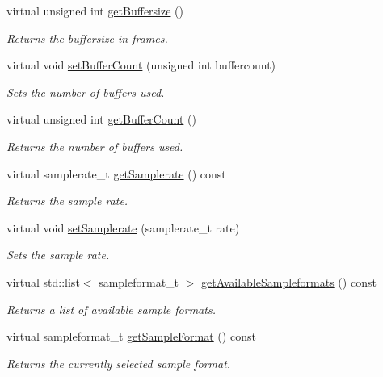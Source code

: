\begin{DoxyCompactItemize}
virtual unsigned int \hyperlink{classNl_1_1AudioAlsa_a61e54f409c8281b3a6dc3feabbe47514}{get\-Buffersize} ()
\begin{DoxyCompactList}\small\item\em Returns the buffersize in frames. \end{DoxyCompactList}\item 
virtual void \hyperlink{classNl_1_1AudioAlsa_a17d24c379eb471145be2e88626e9da6b}{set\-Buffer\-Count} (unsigned int buffercount)
\begin{DoxyCompactList}\small\item\em Sets the number of buffers used. \end{DoxyCompactList}\item 
virtual unsigned int \hyperlink{classNl_1_1AudioAlsa_a17f6570ad5501c84faf0f06ff3378793}{get\-Buffer\-Count} ()
\begin{DoxyCompactList}\small\item\em Returns the number of buffers used. \end{DoxyCompactList}\item 
virtual samplerate\-\_\-t \hyperlink{classNl_1_1AudioAlsa_a450390b0bbf9465c0a3c9caaf61a4079}{get\-Samplerate} () const 
\begin{DoxyCompactList}\small\item\em Returns the sample rate. \end{DoxyCompactList}\item 
virtual void \hyperlink{classNl_1_1AudioAlsa_a892cf5818d0e7fa43ebc85f4d882f804}{set\-Samplerate} (samplerate\-\_\-t rate)
\begin{DoxyCompactList}\small\item\em Sets the sample rate. \end{DoxyCompactList}\item 
virtual std\-::list$<$ sampleformat\-\_\-t $>$ \hyperlink{classNl_1_1AudioAlsa_a5c95174097753e5bae87e3f943b042c9}{get\-Available\-Sampleformats} () const 
\begin{DoxyCompactList}\small\item\em Returns a list of available sample formats. \end{DoxyCompactList}\item 
virtual sampleformat\-\_\-t \hyperlink{classNl_1_1AudioAlsa_accc91631cf20bc1de1add888c30e007e}{get\-Sample\-Format} () const 
\begin{DoxyCompactList}\small\item\em Returns the currently selected sample format. \end{DoxyCompactList}\item 

\end{DoxyCompactItemize}

